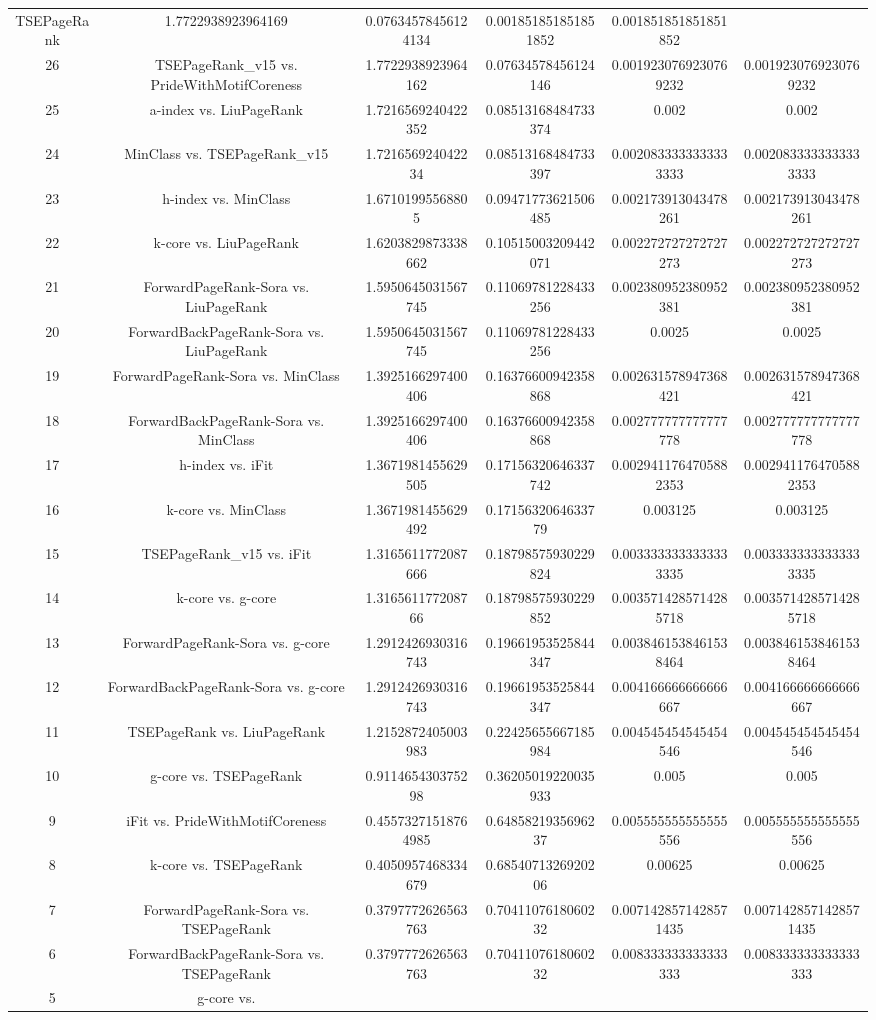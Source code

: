 \documentclass[a4paper,10pt]{article}
\begin{document}
\begin{landscape}
\begin{table}[!htp]
\begin{tabular}{cccccc}
TSEPageRank&1.7722938923964169&0.07634578456124134&0.001851851851851852&0.001851851851851852\\26&TSEPageRank_v15 vs. PrideWithMotifCoreness&1.7722938923964162&0.07634578456124146&0.0019230769230769232&0.0019230769230769232\\25&a-index vs. LiuPageRank&1.7216569240422352&0.08513168484733374&0.002&0.002\\24&MinClass vs. TSEPageRank_v15&1.721656924042234&0.08513168484733397&0.0020833333333333333&0.0020833333333333333\\23&h-index vs. MinClass&1.67101995568805&0.09471773621506485&0.002173913043478261&0.002173913043478261\\22&k-core vs. LiuPageRank&1.6203829873338662&0.10515003209442071&0.002272727272727273&0.002272727272727273\\21&ForwardPageRank-Sora vs. LiuPageRank&1.5950645031567745&0.11069781228433256&0.002380952380952381&0.002380952380952381\\20&ForwardBackPageRank-Sora vs. LiuPageRank&1.5950645031567745&0.11069781228433256&0.0025&0.0025\\19&ForwardPageRank-Sora vs. MinClass&1.3925166297400406&0.16376600942358868&0.002631578947368421&0.002631578947368421\\18&ForwardBackPageRank-Sora vs. MinClass&1.3925166297400406&0.16376600942358868&0.002777777777777778&0.002777777777777778\\17&h-index vs. iFit&1.3671981455629505&0.17156320646337742&0.0029411764705882353&0.0029411764705882353\\16&k-core vs. MinClass&1.3671981455629492&0.1715632064633779&0.003125&0.003125\\15&TSEPageRank_v15 vs. iFit&1.3165611772087666&0.18798575930229824&0.0033333333333333335&0.0033333333333333335\\14&k-core vs. g-core&1.316561177208766&0.18798575930229852&0.0035714285714285718&0.0035714285714285718\\13&ForwardPageRank-Sora vs. g-core&1.2912426930316743&0.19661953525844347&0.0038461538461538464&0.0038461538461538464\\12&ForwardBackPageRank-Sora vs. g-core&1.2912426930316743&0.19661953525844347&0.004166666666666667&0.004166666666666667\\11&TSEPageRank vs. LiuPageRank&1.2152872405003983&0.22425655667185984&0.004545454545454546&0.004545454545454546\\10&g-core vs. TSEPageRank&0.911465430375298&0.36205019220035933&0.005&0.005\\9&iFit vs. PrideWithMotifCoreness&0.45573271518764985&0.6485821935696237&0.005555555555555556&0.005555555555555556\\8&k-core vs. TSEPageRank&0.4050957468334679&0.6854071326920206&0.00625&0.00625\\7&ForwardPageRank-Sora vs. TSEPageRank&0.3797772626563763&0.7041107618060232&0.0071428571428571435&0.0071428571428571435\\6&ForwardBackPageRank-Sora vs. TSEPageRank&0.3797772626563763&0.7041107618060232&0.008333333333333333&0.008333333333333333\\5&g-core vs. 
\end{tabular}
\end{table}
\end{landscape}
\end{document}
